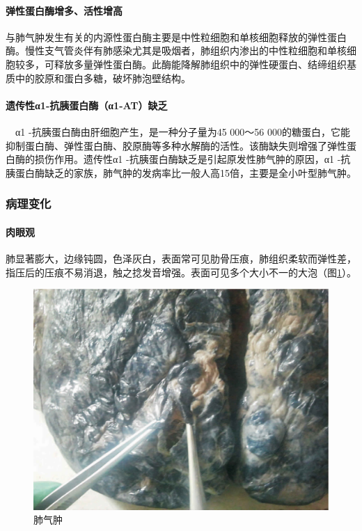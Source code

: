 \paragraph{弹性蛋白酶增多、活性增高}
与肺气肿发生有关的内源性蛋白酶主要是中性粒细胞和单核细胞释放的弹性蛋白酶。慢性支气管炎伴有肺感染尤其是吸烟者，肺组织内渗出的中性粒细胞和单核细胞较多，可释放多量弹性蛋白酶。此酶能降解肺组织中的弹性硬蛋白、结缔组织基质中的胶原和蛋白多糖，破坏肺泡壁结构。

\paragraph{遗传性α{1}-抗胰蛋白酶（α{1}-AT）缺乏} 　α{1}
-抗胰蛋白酶由肝细胞产生，是一种分子量为45 000～56
000的糖蛋白，它能抑制蛋白酶、弹性蛋白酶、胶原酶等多种水解酶的活性。该酶缺失则增强了弹性蛋白酶的损伤作用。遗传性α{1}
-抗胰蛋白酶缺乏是引起原发性肺气肿的原因，α{1}
-抗胰蛋白酶缺乏的家族，肺气肿的发病率比一般人高15倍，主要是全小叶型肺气肿。

\subsubsection{病理变化}

\paragraph{肉眼观}
肺显著膨大，边缘钝圆，色泽灰白，表面常可见肋骨压痕，肺组织柔软而弹性差，指压后的压痕不易消退，触之捻发音增强。表面可见多个大小不一的大泡（图\ref{fig7-3}）。

\begin{figure}[!htbp]
 \centering
 \includegraphics{./images/Image00112.jpg}
 \captionsetup{justification=centering}
 \caption{肺气肿}
 \label{fig7-3}
  \end{figure} 

